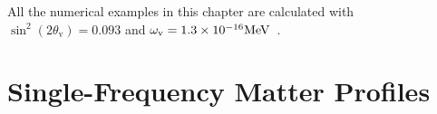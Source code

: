 All the numerical examples in this chapter are calculated with $\sin^2(2\theta_{\mathrm v}) = 0.093$ and $\omega_{\mathrm v} = 1.3\times 10^{-16}\mathrm{MeV}$~\cite{Patrignani:2016xqp}.






\section{\label{chap:matter-sec:single}Single-Frequency Matter Profiles}%








